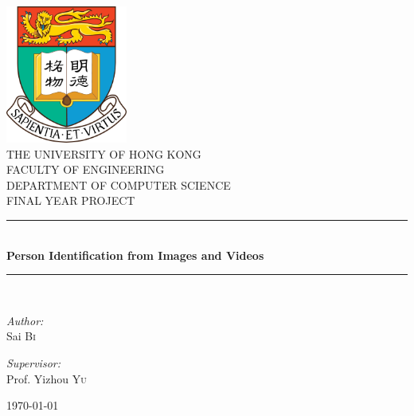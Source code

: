 \documentclass[pdftex,12pt,a4paper]{report}
\newcommand{\HRule}{\rule{\linewidth}{0.5mm}}
\begin{document}
\renewcommand{\bibname}{References}

\begin{titlepage}
\begin{center}

\includegraphics[width=0.3\textwidth]{./res/hku-logo}~\\[1cm]

\uppercase{\LARGE The University of Hong Kong}\\[0.5cm]
\uppercase{\LARGE Faculty of Engineering}\\[0.5cm]
\uppercase{\LARGE Department of Computer Science}\\[1.5cm]

\uppercase{\Large Final Year Project}\\[0.5cm]

\HRule \\[0.4cm]
{ \huge \bfseries Person Identification from Images and Videos \\[0.4cm] }

\HRule \\[1.5cm]

\begin{minipage}{0.4\textwidth}
\begin{flushleft} \large
\emph{Author:}\\
Sai \textsc{Bi}
\end{flushleft}
\end{minipage}
\begin{minipage}{0.4\textwidth}
\begin{flushright} \large
\emph{Supervisor:} \\
Prof. Yizhou \textsc{Yu}
\end{flushright}
\end{minipage}

\vfill

{\large \today}

\end{center}
\end{titlepage}
\end{document}
